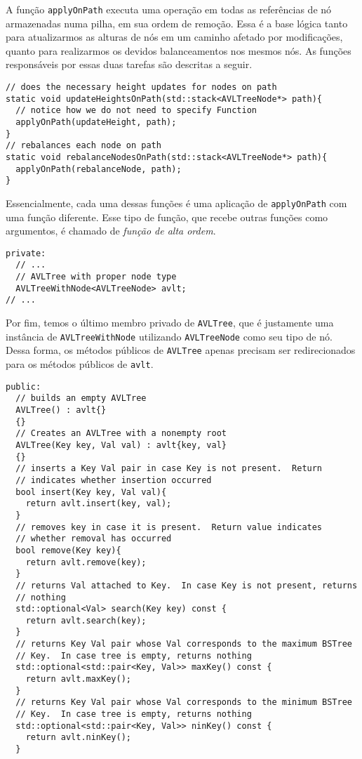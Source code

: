\documentclass[11pt]{article}
\begin{document}
A função \texttt{applyOnPath} executa uma operação em todas as
referências de nó armazenadas numa pilha, em sua ordem de remoção.
Essa é a base lógica tanto para atualizarmos as alturas de nós em
um caminho afetado por modificações, quanto para realizarmos os
devidos balanceamentos nos mesmos nós.  As funções responsáveis
por essas duas tarefas são descritas a seguir.

\begin{verbatim}
// does the necessary height updates for nodes on path
static void updateHeightsOnPath(std::stack<AVLTreeNode*> path){
  // notice how we do not need to specify Function
  applyOnPath(updateHeight, path);
}
// rebalances each node on path
static void rebalanceNodesOnPath(std::stack<AVLTreeNode*> path){
  applyOnPath(rebalanceNode, path);
}
\end{verbatim}

Essencialmente, cada uma dessas funções é uma aplicação de
\texttt{applyOnPath} com uma função diferente.  Esse tipo de função, que
recebe outras funções como argumentos, é chamado de \emph{função de alta
ordem}.

\begin{verbatim}
private:
  // ...
  // AVLTree with proper node type
  AVLTreeWithNode<AVLTreeNode> avlt;
// ...
\end{verbatim}

Por fim, temos o último membro privado de \texttt{AVLTree}, que é
justamente uma instância de \texttt{AVLTreeWithNode} utilizando
\texttt{AVLTreeNode} como seu tipo de nó.  Dessa forma, os métodos
públicos de \texttt{AVLTree} apenas precisam ser redirecionados para os
métodos públicos de \texttt{avlt}.

\pagebreak

\begin{verbatim}
public:
  // builds an empty AVLTree
  AVLTree() : avlt{}
  {}
  // Creates an AVLTree with a nonempty root
  AVLTree(Key key, Val val) : avlt{key, val}
  {}
  // inserts a Key Val pair in case Key is not present.  Return
  // indicates whether insertion occurred
  bool insert(Key key, Val val){
    return avlt.insert(key, val);
  }
  // removes key in case it is present.  Return value indicates
  // whether removal has occurred
  bool remove(Key key){
    return avlt.remove(key);
  }
  // returns Val attached to Key.  In case Key is not present, returns
  // nothing
  std::optional<Val> search(Key key) const {
    return avlt.search(key);
  }
  // returns Key Val pair whose Val corresponds to the maximum BSTree
  // Key.  In case tree is empty, returns nothing
  std::optional<std::pair<Key, Val>> maxKey() const {
    return avlt.maxKey();
  }
  // returns Key Val pair whose Val corresponds to the minimum BSTree
  // Key.  In case tree is empty, returns nothing
  std::optional<std::pair<Key, Val>> ninKey() const {
    return avlt.ninKey();
  }
\end{verbatim}
\end{document}

